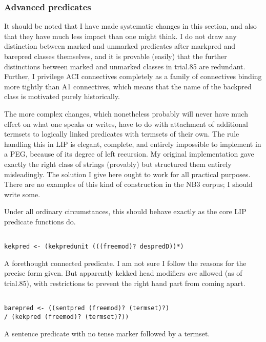 \documentclass[12pt]{article}
\begin{document}
\subsubsection{Advanced predicates}

It should be noted that I have made systematic changes in this section, and also that they have much less impact
than one might think.  I do not draw any distinction between marked and unmarked predicates after markpred and barepred classes themselves, and it is provable (easily) that the further distinctions between marked and unmarked classes in trial.85 are redundant.
Further, I privilege ACI connectives completely as a family of connectives binding more tightly than A1 connectives, which means that the name of the backpred class is motivated purely historically.

The more complex changes, which nonetheless probably will never have much effect on what one speaks or writes,
have to do with attachment of additional termsets to logically linked predicates with termsets of their own.  The rule handling this in LIP is elegant, complete, and entirely impossible to implement in a PEG, because of its degree of left recursion.  My original implementation gave exactly the right class of strings (provably) but structured them entirely misleadingly.   The solution I give here
ought to work for all practical purposes.  There are no examples of this kind of construction in the NB3 corpus; I should write some.

Under all ordinary circumstances, this should behave exactly as the core LIP predicate functions do.

\begin{verbatim}

kekpred <- (kekpredunit (((freemod)? despredD))*)

\end{verbatim}

A forethought connected predicate.  I am not sure I follow the reasons for the precise form given.  But apparently
kekked head modifiers {\em are\/} allowed (as of trial.85), with restrictions to prevent the right hand part from coming apart.

\begin{verbatim}

barepred <- ((sentpred (freemod)? (termset)?) 
/ (kekpred (freemod)? (termset)?))

\end{verbatim}

A sentence predicate with no tense marker followed by a termset.
\end{document}
